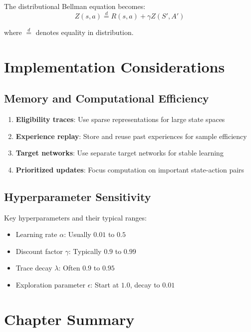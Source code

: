The distributional Bellman equation becomes:
\begin{equation}
Z(s,a) \stackrel{d}{=} R(s,a) + \gamma Z(S', A')
\end{equation}

where $\stackrel{d}{=}$ denotes equality in distribution.

\section{Implementation Considerations}

\subsection{Memory and Computational Efficiency}

\begin{notebox}
\begin{enumerate}
\item \textbf{Eligibility traces}: Use sparse representations for large state spaces
\item \textbf{Experience replay}: Store and reuse past experiences for sample efficiency
\item \textbf{Target networks}: Use separate target networks for stable learning
\item \textbf{Prioritized updates}: Focus computation on important state-action pairs
\end{enumerate}
\end{notebox}

\subsection{Hyperparameter Sensitivity}

Key hyperparameters and their typical ranges:
\begin{itemize}
\item Learning rate $\alpha$: Usually $0.01$ to $0.5$
\item Discount factor $\gamma$: Typically $0.9$ to $0.99$
\item Trace decay $\lambda$: Often $0.9$ to $0.95$
\item Exploration parameter $\epsilon$: Start at $1.0$, decay to $0.01$
\end{itemize}

\section{Chapter Summary}

